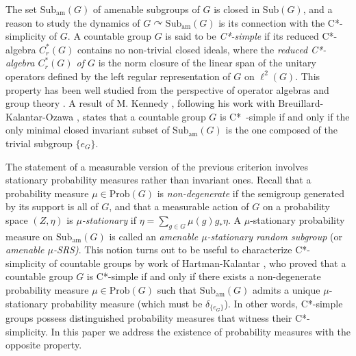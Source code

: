 \documentclass[reqno,a4paper,11pt]{amsart}
\numberwithin{equation}{section}
\newcommand{\1}{\mathbf{1}}
\newcommand{\subam}[1]{\mathrm{Sub}_{\mathrm{am}}(#1)}
\theoremstyle{definition}
\begin{document}
The set $\mathrm{Sub}_\mathrm{am}(G)$ of amenable subgroups of $G$ is closed in $\mathrm{Sub}(G)$, and a reason to study the dynamics of $G \curvearrowright \subam{G}$ is its connection with the C*-simplicity of $G$. A countable group $G$ is said to be \emph{C*-simple} if its reduced C*-algebra $C^\ast_r(G)$ contains no non-trivial closed ideals, where the \emph{reduced C*-algebra $C_r^\ast(G)$ of $G$} is the norm closure of the linear span of the unitary operators defined by the left regular representation of $G$ on $\ell^2(G)$. This property has been well studied from the perspective of operator algebras and group theory \cite{Powers1975, BekkaCowlingDeLaHarpe1994}. A result of M. Kennedy \cite{Kennedy2020}, following his work with Breuillard-Kalantar-Ozawa \cite{KalantarKennedy2017, BreuillardKalantarKennedyOzawa2017}, states that a countable group $G$ is C*~-simple if and only if the only minimal closed invariant subset of $\subam{G}$ is the one composed of the trivial subgroup $\{e_G\}$.

The statement of a measurable version of the previous criterion involves stationary probability measures rather than invariant ones. Recall that a probability measure $\mu \in \mathrm{Prob}(G)$ is \emph{non-degenerate} if the semigroup generated by its support is all of $G$, and that a measurable action of $G$ on a probability space $(Z, \eta)$ is \emph{$\mu$-stationary} if $\eta = \sum_{g \in G} \mu(g)g_\ast \eta$. A $\mu$-stationary probability measure on $\subam{G}$ is called an \emph{amenable $\mu$-stationary random subgroup} (or \emph{amenable $\mu$-SRS)}. This notion turns out to be useful to characterize C*-simplicity of countable groups by work of Hartman-Kalantar \cite{HartmanKalantar2022}, who proved that a countable group $G$ is C*-simple if and only if there exists a non-degenerate probability measure $\mu \in \mathrm{Prob}(G)$ such that $\subam{G}$ admits a unique $\mu$-stationary probability measure (which must be $\delta_{\{e_G\}}$). In other words, C*-simple groups possess distinguished probability measures that witness their C*-simplicity. In this paper we address the existence of probability measures with the opposite property.
\end{document}
